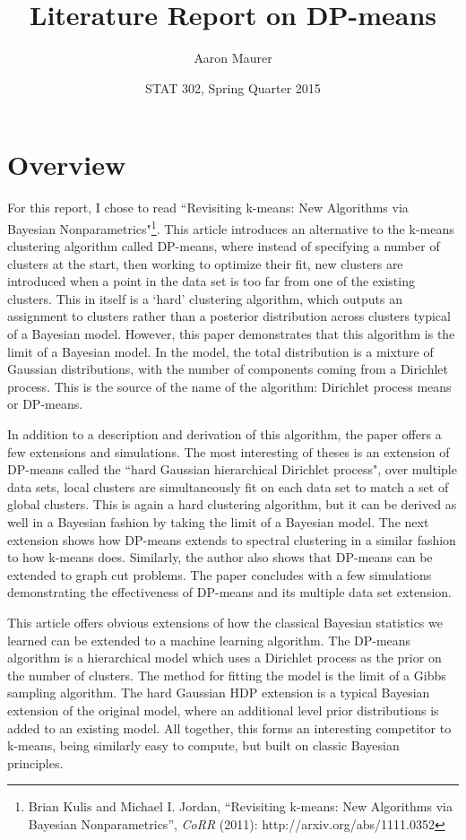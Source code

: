 \documentclass[11pt]{article}
\theoremstyle{definition}
\begin{document}
\title{Literature Report on DP-means}
\author{Aaron Maurer}
\date{STAT 302, Spring Quarter 2015}
\maketitle
\section{Overview}
For this report, I chose to read ``Revisiting k-means: New Algorithms via Bayesian Nonparametrics"\footnote{Brian Kulis and Michael I. Jordan, ``Revisiting k-means: New Algorithms via Bayesian Nonparametrics'', \textit{CoRR} (2011): http://arxiv.org/abs/1111.0352}. This article introduces an alternative to the k-means clustering algorithm called DP-means, where instead of specifying a number of clusters at the start, then working to optimize their fit, new clusters are introduced when a point in the data set is too far from one of the existing clusters. This in itself is a `hard' clustering algorithm, which outputs an assignment to clusters rather than a posterior distribution across clusters typical of a Bayesian model. However, this paper demonstrates that this algorithm is the limit of a Bayesian model. In the model, the total distribution is a mixture of Gaussian distributions, with the number of components coming from a Dirichlet process. This is the source of the name of the algorithm: Dirichlet process means or DP-means. \par
In addition to a description and derivation of this algorithm, the paper offers a few extensions and simulations. The most interesting of theses is an extension of DP-means called the ``hard Gaussian hierarchical Dirichlet process", over multiple data sets, local clusters are simultaneously fit on each data set to match a set of global clusters. This is again a hard clustering algorithm, but it can be derived as well in a Bayesian fashion by taking the limit of a Bayesian model. The next extension shows how DP-means extends to spectral clustering in a similar fashion to how k-means does. Similarly, the author also shows that DP-means can be extended to graph cut problems. The paper concludes with a few simulations demonstrating the effectiveness of DP-means and its multiple data set extension. \par
This article offers obvious extensions of how the classical Bayesian statistics we learned can be extended to a machine learning algorithm. The DP-means algorithm is a hierarchical model which uses a Dirichlet process as the prior on the number of clusters. The method for fitting the model is the limit of a Gibbs sampling algorithm. The hard Gaussian HDP extension is a typical Bayesian extension of the original model, where an additional level prior distributions is added to an existing model. All together, this forms an interesting competitor to k-means, being similarly easy to compute, but built on classic Bayesian principles.
\end{document}
